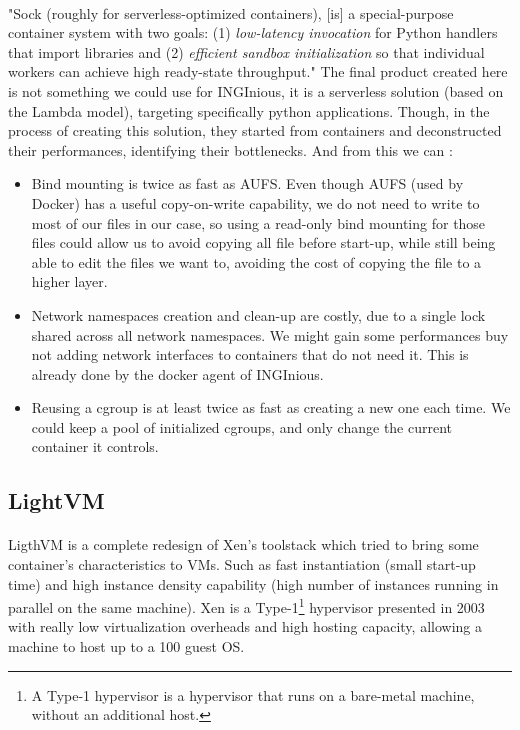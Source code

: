 \paragraph{}"Sock (roughly for serverless-optimized containers), [is] a special-purpose container system with two goals: (1) \textit{low-latency invocation} for Python handlers that import libraries and (2) \textit{efficient sandbox initialization} so that individual workers can achieve high ready-state throughput." \cite{oakes2018sock}  The final product created here is not something we could use for INGInious, it is a serverless solution (based on the Lambda model), targeting specifically python applications.  Though, in the process of creating this solution, they started from containers and deconstructed their performances, identifying their bottlenecks.  And from this we can :
\begin{itemize}
\renewcommand\labelitemi{--}
  \item Bind mounting is twice as fast as AUFS.  Even though AUFS (used by Docker) has a useful copy-on-write capability, we do not need to write to most of our files in our case, so using a read-only bind mounting for those files could allow us to avoid copying all file before start-up, while still being able to edit the files we want to, avoiding the cost of copying the file to a higher layer.
  \item Network namespaces creation and clean-up are costly, due to a single lock shared across all network namespaces.  We might gain some performances buy not adding network interfaces to containers that do not need it.  This is already done by the docker agent of INGInious.
  \item Reusing a cgroup is at least twice as fast as creating a new one each time.  We could keep a pool of initialized cgroups, and only change the current container it controls.
\end{itemize}

\subsection{LightVM} 
\paragraph{}LigthVM is a complete redesign of Xen's toolstack which tried to bring some container's characteristics to VMs.  Such as fast instantiation (small start-up time) and high instance density capability (high number of instances running in parallel on the same machine).\cite{manco2017my}  Xen is a Type-1\footnote{A Type-1 hypervisor is a hypervisor that runs on a bare-metal machine, without an additional host.} hypervisor presented in 2003 with really low virtualization overheads and high hosting capacity, allowing a machine to host up to a 100 guest OS.\cite{barham2003xen}  
